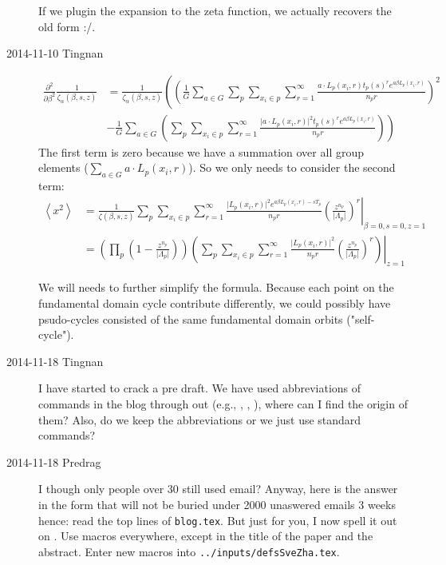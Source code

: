 \begin{description}
If we plugin the expansion to the zeta function, we actually recovers
the old form :/.

\item[2014-11-10 Tingnan]

\begin{align*}
\frac{\partial^{2}}{\partial\beta^{2}}\frac{1}{\zeta_{\alpha}(\beta,s,z)} & =\frac{1}{\zeta_{\alpha}(\beta,s,z)}\left(\left(\frac{1}{G}\sum_{a\in G}\sum_{p}\sum_{x_{i}\in p}\sum_{r=1}^{\infty}\frac{a\cdot L_{p}(x_{i},r)t_{p}(s)^{r}e^{a\beta L_{p}(x_{i},r)}}{n_{p}r}\right)^{2}\right.\\
 & \left.-\frac{1}{G}\sum_{a\in G}\left(\sum_{p}\sum_{x_{i}\in p}\sum_{r=1}^{\infty}\frac{\vert a\cdot L_{p}(x_{i},r)\vert^{2}t_{p}(s)^{r}e^{a\beta L_{p}(x_{i},r)}}{n_{p}r}\right)\right)
\end{align*}
The first term is zero because we have a summation over all group elements ($\sum_{a\in G} a\cdot L_p(x_i,r)$).
So we only needs to consider the second term:
\begin{align*}
\left\langle x^{2}\right\rangle  & =\left.\frac{1}{\zeta(\beta,s,z)}\sum_{p}\sum_{x_{i}\in p}\sum_{r=1}^{\infty}\frac{\vert L_{p}(x_{i},r)\vert^{2}e^{a\beta L_{p}(x_{i},r)-sT_{p}}}{n_{p}r}\left(\frac{z^{n_{p}}}{\vert\Lambda_{p}\vert}\right)^{r}\right|_{\beta=0,s=0,z=1}\\
 & =\left.\left(\prod_{p}\left(1-\frac{z^{n_{p}}}{\vert\Lambda_{p}\vert}\right)\right)\left(\sum_{p}\sum_{x_{i}\in p}\sum_{r=1}^{\infty}\frac{\vert L_{p}(x_{i},r)\vert^{2}}{n_{p}r}\left(\frac{z^{n_{p}}}{\vert\Lambda_{p}\vert}\right)^{r}\right)\right|_{z=1}
\end{align*}


We will needs to further simplify the formula. Because each point on the fundamental domain cycle contribute differently, we could possibly have psudo-cycles consisted of the same fundamental domain orbits ("self-cycle").

\item[2014-11-18 Tingnan]
I have started to crack a pre draft. We have used abbreviations of
commands in the blog through out (e.g., \cycle{\dots}, ,
\etc), where can I find the origin of them? Also, do we keep the
abbreviations or we just use standard commands?

\item[2014-11-18 Predrag]
I though only people over 30 still used email? Anyway, here is the answer
in the form that will not be buried under 2000 unaswered emails 3 weeks hence:
read the top lines of \texttt{blog.tex}. But just for you, I now spell it out
on . Use macros everywhere, except in the
title of the paper and the abstract. Enter new macros into
\texttt{../inputs/defsSveZha.tex}.



\end{description}
